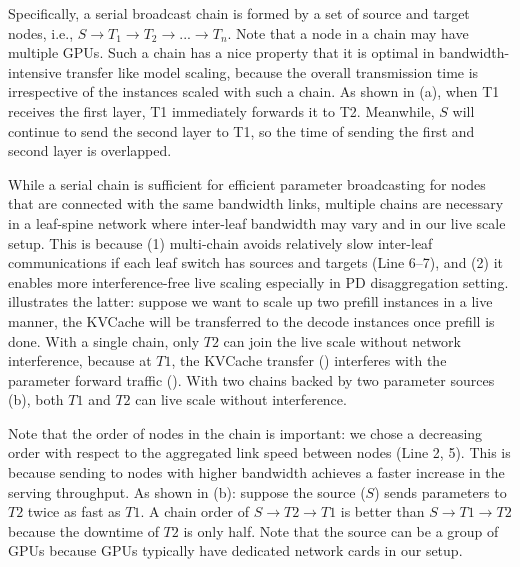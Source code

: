 Specifically, a serial broadcast chain is formed by a set of source and target nodes,
i.e., $S \rightarrow T_1 \rightarrow T_2 \rightarrow ... \rightarrow T_n$.       
Note that a node in a chain may have multiple GPUs. 
Such a chain has a nice property that it is optimal in bandwidth-intensive transfer like 
model scaling, because the overall transmission time is irrespective of the instances scaled with such a chain.
As shown in {} (a), 
when T1 receives the first layer,
T1 immediately forwards it to T2.
Meanwhile, $S$ will continue to send the second layer to T1,
so the time of sending the first and second layer is overlapped.


While a serial chain is sufficient for efficient parameter broadcasting for nodes that are connected
with the same bandwidth links,
multiple chains are necessary in a leaf-spine network where inter-leaf bandwidth may vary
and in our live scale setup.
This is
because (1) multi-chain avoids relatively slow inter-leaf communications if each leaf switch
has sources and targets (Line 6--7),
and (2) it enables more interference-free live scaling especially in PD disaggregation setting.
{} illustrates the latter:
suppose we want to scale up two prefill instances in a live manner,
the KVCache will be transferred to the decode instances once prefill is done.
With a single chain, only $T2$ can join the live scale without network interference,
because at $T1$, the KVCache transfer () interferes with the
parameter forward traffic ().
With two chains backed by two parameter sources (b), both $T1$ and $T2$
can live scale without interference.

Note that the order of nodes in the chain is important:
we chose a decreasing order with respect to the aggregated link speed between nodes (Line 2, 5).
This is because 
sending to nodes with higher bandwidth achieves a faster increase in the serving throughput. 
As shown in {} (b): 
suppose the source ($S$) sends parameters to $T2$ twice as fast as $T1$.
A chain order of $S \rightarrow T2 \rightarrow T1$ is better than $S \rightarrow T1 \rightarrow T2$
because the downtime of $T2$ is only half.
Note that the source can be a group of GPUs because GPUs typically have dedicated network cards
in our setup.

